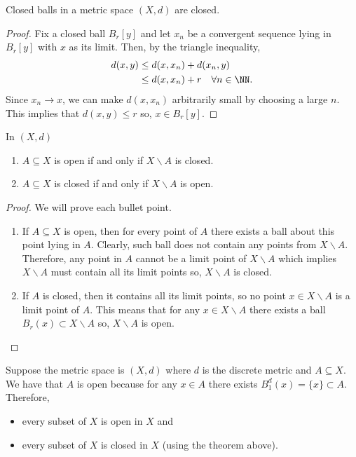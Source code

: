 \documentclass[12pt, a4paper]{article}
\begin{document}
\begin{lemma}
    Closed balls in a metric space \((X,d)\) are closed.
\end{lemma}

\begin{proof}
    Fix a closed ball \(B_r[y]\) and let \(x_n\) be a convergent sequence lying in \(B_r[y]\) with \(x\) as its limit. Then, by the triangle inequality,
    \[\begin{aligned}
        d(x,y) &\leq d(x,x_n)+d(x_n,y) \\
        &\leq d(x,x_n)+r \quad \forall n \in \NN.
    \end{aligned}\]
    Since \(x_n \to x\), we can make \(d(x,x_n)\) arbitrarily small by choosing a large \(n\). This implies that \(d(x,y) \leq r\) so, \(x \in B_r[y]\).
\end{proof}

\begin{mdthm}
    In \((X,d)\)
    \begin{enumerate}
        \item \(A \subseteq X\) is open if and only if \(X \backslash A\) is closed.
        \item \(A \subseteq X\) is closed if and only if \(X \backslash A\) is open.
    \end{enumerate}
\end{mdthm}

\begin{proof}
    We will prove each bullet point.
    \begin{enumerate}
        \item If \(A \subseteq X\) is open, then for every point of \(A\) there exists a ball about this point lying in \(A\). Clearly, such ball does not contain any points from \(X \backslash A\). Therefore, any point in \(A\) cannot be a limit point of \(X \backslash A\) which implies \(X \backslash A\) must contain all its limit points so, \(X \backslash A\) is closed.
        \item If \(A\) is closed, then it contains all its limit points, so no point \(x \in X \backslash A\) is a limit point of \(A\). This means that for any \(x \in X \backslash A\) there exists a ball \(B_r(x) \subset X \backslash A\) so, \(X \backslash A\) is open.
    \end{enumerate}
\end{proof}

\begin{mdexample}
    Suppose the metric space is \((X,d)\) where \(d\) is the discrete metric and \(A \subseteq X\). We have that \(A\) is open because for any \(x \in A\) there exists \(B_1^d(x)= \{x\} \subset A\). Therefore,
    \begin{itemize}
        \item every subset of \(X\) is open in \(X\) and
        \item every subset of \(X\) is closed in \(X\) (using the theorem above).
    \end{itemize}
\end{mdexample}
\end{document}
